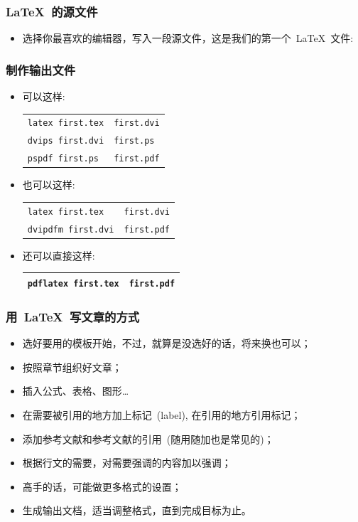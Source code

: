 \begin{frame}
    \frametitle{\LaTeX~的源文件}
	\begin{itemize}
	    \item 选择你最喜欢的编辑器，写入一段源文件，这是我们的第一个~\LaTeX~文件:
	\end{itemize}
	
\end{frame}
\begin{frame}
    \frametitle{制作输出文件}
	\begin{itemize}[<+->]
		\item 可以这样:
		    
		\begin{tabular}[c]{l@{$\Rightarrow$}l}
			\hline
			\texttt{latex first.tex} & \texttt{first.dvi} 		\\
			\texttt{dvips first.dvi} & \texttt{first.ps} 		\\
			\texttt{pspdf first.ps}  & \texttt{first.pdf} 		\\
			\hline
		\end{tabular}
		
		\item 也可以这样:

		\begin{tabular}[c]{l@{$\Rightarrow$}l}
			\hline
			\texttt{latex first.tex} & \texttt{first.dvi} 		\\
			\texttt{\alert{dvipdfm} first.dvi} & \texttt{first.pdf}		\\
			\hline
		\end{tabular}

		\item 还可以直接这样:

		\begin{tabular}[c]{l@{$\Rightarrow$}l}
			\hline
			\texttt{\alert{pdflatex} first.tex} & \texttt{first.pdf} \\
			\hline
		\end{tabular}
	\end{itemize}
\end{frame}

\begin{frame}
	\frametitle{用~\LaTeX~写文章的方式}
	\begin{itemize}
		\item<+-> 选好要用的模板开始，不过，就算是没选好的话，将来换也可以；
		\item<+-> 按照章节组织好文章；
		\item<+-> 插入公式、表格、图形\dots
		\item<+-> 在需要被引用的地方加上标记~(label), 在引用的地方引用标记；
		\item<+-> 添加参考文献和参考文献的引用~(随用随加也是常见的)；
		\item<+-> 根据行文的需要，对需要强调的内容加以强调；
		\item<+-> 高手的话，可能做更多格式的设置；
		\item<+-> 生成输出文档，适当调整格式，直到完成目标为止。
	\end{itemize}
\end{frame}
